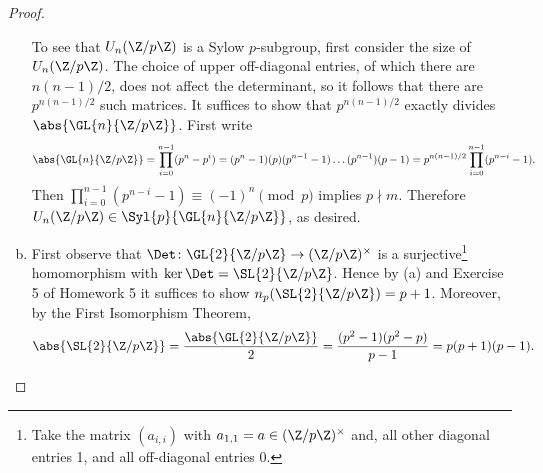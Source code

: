 \documentclass[10pt]{amsart}
\begin{document}
\begin{thm}
\begin{proof}
\begin{enumerate}[(a)]
      To see that $U_n(\Z/p\Z)$ is a Sylow $p$-subgroup, first consider the size of $U_n(\Z/p\Z)$.
      The choice of upper off-diagonal entries, of which there are $n(n-1)/2$, does not affect the determinant, so it follows that there are $p^{n(n-1)/2}$ such matrices.
      It suffices to show that $p^{n(n-1)/2}$ exactly divides $\abs{\GL{n}{\Z/p\Z}}$.
      First write 
      $$\abs{\GL{n}{\Z/p\Z}} = \prod_{i=0}^{n-1} (p^n - p^i) = (p^n - 1)(p)(p^{n-1} - 1) \ldots (p^{n-1})(p - 1) = p^{n(n-1)/2}\prod_{i=0}^{n-1}(p^{n-i} - 1).$$
      Then  $\prod_{i=0}^{n-1}(p^{n-i} - 1)  \equiv (-1)^n \pmod{p}$ implies $p \nmid m$.
      Therefore $U_n(\Z/p\Z) \in \Syl{p}{\GL{n}{\Z/p\Z}}$, as desired.
    \item
      First observe that $\Det \colon \GL{2}{\Z/p\Z} \rightarrow (\Z/p\Z)^\times$ is a surjective\footnote[1]{Take the matrix $(a_{i,i})$ with $a_{1,1} = a \in (\Z/p\Z)^\times$ and, all other diagonal entries 1, and all off-diagonal entries 0.} homomorphism  with $\ker\Det = \SL{2}{\Z/p\Z}$.
      Hence by (a) and Exercise 5 of Homework 5 it suffices to show $n_p(\SL{2}{\Z/p\Z}) = p + 1$.
      Moreover, by the First Isomorphism Theorem,
      $$\abs{\SL{2}{\Z/p\Z}} = \frac{\abs{\GL{2}{\Z/p\Z}}}{2} = \frac{(p^2 - 1)(p^2 - p)}{p-1} = p(p+1)(p-1).$$
        

\end{enumerate}
\end{proof}
\end{thm}
\end{document}
